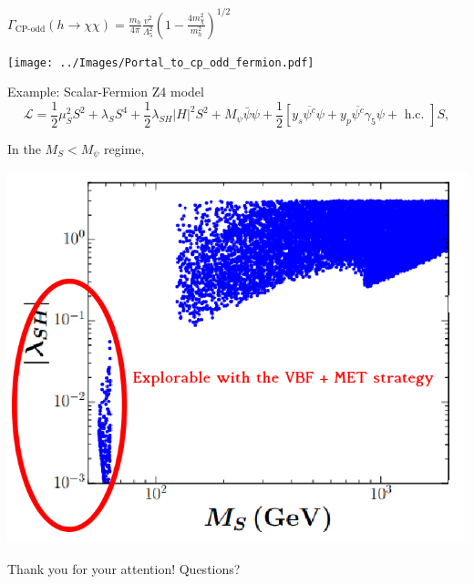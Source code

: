 \documentclass{../../bredelebeamer}
\begin{document}
\begin{frame}{$\Gamma_{\text{CP-odd}}(h \rightarrow \chi \chi)=\frac{m_h}{4 \pi} \frac{v^2}{\Lambda_5^2}\left(1-\frac{4 m_\chi^2}{m_h^2}\right)^{1 / 2}$}
    \begin{center}
        \texttt{[image: ../Images/Portal\_to\_cp\_odd\_fermion.pdf]}
    \end{center}
\end{frame}

\begin{frame}{Example: Scalar-Fermion Z4 model}
    $$
    \mathcal{L}=\frac{1}{2} \mu_S^2 S^2+\lambda_S S^4+\frac{1}{2} \lambda_{S H}|H|^2 S^2+M_\psi \bar{\psi} \psi+\frac{1}{2}\left[y_s \overline{\psi^c} \psi+y_p \overline{\psi^c} \gamma_5 \psi+\text { h.c. }\right] S,
    $$

    In the $M_S < M_\psi$ regime, 
    \begin{center}
        \includegraphics[width=.6\textwidth]{../Images/Z4_Example.png}
    \end{center}
    \cite{Yaguna:2021rds}
\end{frame}

\begin{frame}
    \centering
    \Huge Thank you for your attention!
    \vfill
    \Large Questions?
\end{frame}
\end{document}
